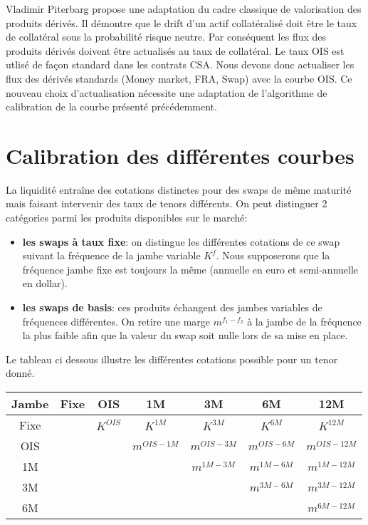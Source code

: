 \documentclass{article}
\begin{document}
Vladimir Piterbarg propose une adaptation du cadre classique de valorisation des produits dérivés. Il démontre que le drift d’un actif collatéralisé doit être le taux de collatéral sous la probabilité risque neutre. Par conséquent les flux des produits dérivés doivent être actualisés au taux de collatéral. Le taux OIS est utlisé de façon standard dans les contrats CSA. Nous devons donc actualiser les flux des dérivés standards (Money market, FRA, Swap) avec la courbe OIS. Ce nouveau choix d'actualisation nécessite une adaptation de l'algorithme de calibration de la courbe présenté précédemment.\\

\section*{Calibration des différentes courbes}

La liquidité entraîne des cotations distinctes pour des swaps de même maturité mais faisant intervenir des taux de tenors différents. On peut distinguer 2 catégories parmi les produits disponibles sur le marché:\\
\begin{itemize}
\item \textbf{les swaps à taux fixe}: on distingue les différentes cotations de ce swap suivant la fréquence de la jambe variable $K^f$. Nous supposerons que la fréquence jambe fixe est toujours la même (annuelle en euro et semi-annuelle en dollar).\\

\item \textbf{les swaps de basis}: ces produits échangent des jambes variables de fréquences différentes. On retire une marge $m^{f_1-f_2}$ à la jambe de la fréquence la plus faible afin que la valeur du swap soit nulle lors de sa mise en place.\\ 

\end{itemize}

Le tableau ci dessous illustre les différentes cotations possible pour un tenor donné.

\begin{center}
\begin{tabular}{|c|c|c|c|c|c|c|}
\hline
Jambe&Fixe&OIS&1M&3M&6M&12M\\
\hline
Fixe&&$K^{OIS}$&$K^{1M}$&$K^{3M}$&$K^{6M}$&$K^{12M}$\\
OIS&&&$m^{OIS-1M}$&$m^{OIS-3M}$&$m^{OIS-6M}$&$m^{OIS-12M}$\\
1M&&&&$m^{1M-3M}$&$m^{1M-6M}$&$m^{1M-12M}$\\
3M&&&&&$m^{3M-6M}$&$m^{3M-12M}$\\
6M&&&&&&$m^{6M-12M}$\\
\hline
\end{tabular}
\end{center}
\end{document}
